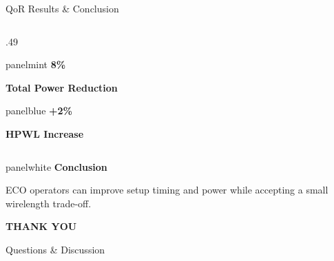 \documentclass[aspectratio=169,10pt]{beamer}
\newcommand{\slidenavigation}{}
\newcommand{\slideposition}{}
\begin{document}
\begin{frame}[label=summary-17]{QoR Results \& Conclusion}
\begin{columns}[T,onlytextwidth]
\begin{column}{.49\textwidth}
\begin{beamercolorbox}[rounded=true,sep=.14cm,wd=\linewidth]{panelmint}
        {\fontsize{24}{27}\selectfont\bfseries\color{Accent}8\%}\par\vspace{.025cm}
        {\small\bfseries Total Power Reduction}\par
      \end{beamercolorbox}
      \vspace{.10cm}
      \begin{beamercolorbox}[rounded=true,sep=.14cm,wd=\linewidth]{panelblue}
        {\fontsize{24}{27}\selectfont\bfseries\color{Ink}+2\%}\par\vspace{.025cm}
        {\small\bfseries HPWL Increase}\par
      \end{beamercolorbox}
    \end{column}
  \end{columns}
  \vspace{.09cm}
  \begin{beamercolorbox}[rounded=true,sep=.13cm,wd=\linewidth]{panelwhite}
    {\small\bfseries\color{Accent}Conclusion}\par\vspace{.025cm}
    {\small\color{Ink}ECO operators can improve setup timing and power while accepting a small wirelength trade-off.}
  \end{beamercolorbox}
  \vspace{.06cm}
\end{frame}

{
\renewcommand{\slidenavigation}{\hyperlink{details-index}{\beamerbutton{Details index}}}
\renewcommand{\slideposition}{Summary 18 / 18}
\begin{frame}[plain,label=summary-18]
  \centering
  \vfill
  {\fontsize{36}{42}\selectfont\bfseries\color{Ink}THANK YOU}\par
  \vspace{.37cm}
  {\fontsize{19}{24}\selectfont\color{Muted}Questions \& Discussion}\par
  \vfill
\hyperlink{details-index}{}\par\vspace{.30cm}
\end{frame}}
\end{document}
